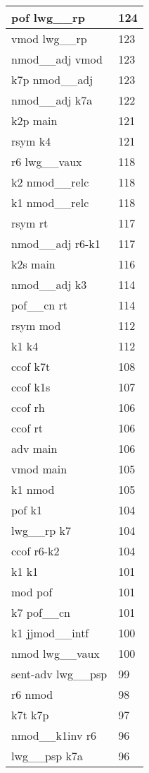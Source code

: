 \documentclass[a4 paper]{article}
\begin{document}
\begin{longtable}{p{}p{}}
pof lwg\_\_rp  & 124 \\ \midrule
vmod lwg\_\_rp  & 123 \\ \midrule
nmod\_\_adj vmod  & 123 \\ \midrule
k7p nmod\_\_adj  & 123 \\ \midrule
nmod\_\_adj k7a  & 122 \\ \midrule
k2p main  & 121 \\ \midrule
rsym k4  & 121 \\ \midrule
r6 lwg\_\_vaux  & 118 \\ \midrule
k2 nmod\_\_relc  & 118 \\ \midrule
k1 nmod\_\_relc  & 118 \\ \midrule
rsym rt  & 117 \\ \midrule
nmod\_\_adj r6-k1  & 117 \\ \midrule
k2s main  & 116 \\ \midrule
nmod\_\_adj k3  & 114 \\ \midrule
pof\_\_cn rt  & 114 \\ \midrule
rsym mod  & 112 \\ \midrule
k1 k4  & 112 \\ \midrule
ccof k7t  & 108 \\ \midrule
ccof k1s  & 107 \\ \midrule
ccof rh  & 106 \\ \midrule
ccof rt  & 106 \\ \midrule
adv main  & 106 \\ \midrule
vmod main  & 105 \\ \midrule
k1 nmod  & 105 \\ \midrule
pof k1  & 104 \\ \midrule
lwg\_\_rp k7  & 104 \\ \midrule
ccof r6-k2  & 104 \\ \midrule
k1 k1  & 101 \\ \midrule
mod pof  & 101 \\ \midrule
k7 pof\_\_cn  & 101 \\ \midrule
k1 jjmod\_\_intf  & 100 \\ \midrule
nmod lwg\_\_vaux  & 100 \\ \midrule
sent-adv lwg\_\_psp  & 99 \\ \midrule
r6 nmod  & 98 \\ \midrule
k7t k7p  & 97 \\ \midrule
nmod\_\_k1inv r6  & 96 \\ \midrule
lwg\_\_psp k7a  & 96 \\ \midrule

\end{longtable}
\end{document}
